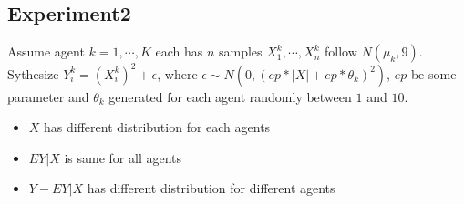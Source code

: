 \documentclass[12pt, a4paper, oneside]{article}
\begin{document}
\subsection{Experiment2}
    Assume agent $k=1,\cdots,K$ each has $n$ samples $X_1^k,\cdots,X_n^k$ follow $N(\mu_k,9)$. Sythesize $Y_i^k=(X_i^k)^2+\epsilon$, where $\epsilon\sim N(0,(ep*|X|+ep*\theta_k)^2)$, $ep$ be some parameter and $\theta_k$ generated for each agent randomly between $1$ and $10$.
    \begin{itemize}
        \item $X$ has different distribution for each agents
        \item $EY|X$ is same for all agents
        \item $Y-EY|X$ has different distribution for different agents
    \end{itemize}
\newpage


\end{document}
